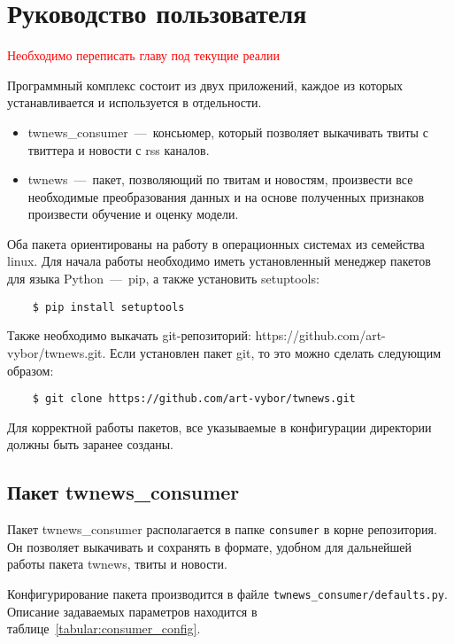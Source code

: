 \section{Руководство пользователя}
    \textcolor{red}{Необходимо переписать главу под текущие реалии}
    
    Программный комплекс состоит из двух приложений, каждое из которых устанавливается и используется в отдельности.
    \begin{itemize}
        \item twnews\_consumer~---~консьюмер, который позволяет выкачивать твиты с твиттера и новости с rss каналов.
        \item twnews~---~пакет, позволяющий по твитам и новостям, произвести все необходимые преобразования данных и на основе полученных признаков произвести обучение и оценку модели.
    \end{itemize}

    Оба пакета ориентированы на работу в операционных системах из семейства linux. Для начала работы необходимо иметь установленный менеджер пакетов для языка Python~---~pip, а также установить setuptools:
    \begin{lstlisting}
    $ pip install setuptools
    \end{lstlisting}
    Также необходимо выкачать git-репозиторий: https://github.com/art-vybor/twnews.git.
    Если установлен пакет git, то это можно сделать следующим образом:
    \begin{lstlisting}
    $ git clone https://github.com/art-vybor/twnews.git
    \end{lstlisting}

    Для корректной работы пакетов, все указываемые в конфигурации директории должны быть заранее созданы.

    \subsection{Пакет twnews\_consumer}
        Пакет twnews\_consumer располагается в папке \lstinline{consumer} в корне репозитория.
        Он позволяет выкачивать и сохранять в формате, удобном для дальнейшей работы пакета twnews, твиты и новости.

        Конфигурирование пакета производится в файле \lstinline{twnews_consumer/defaults.py}.
        Описание задаваемых параметров находится в таблице~\ref{tabular:consumer_config}.


